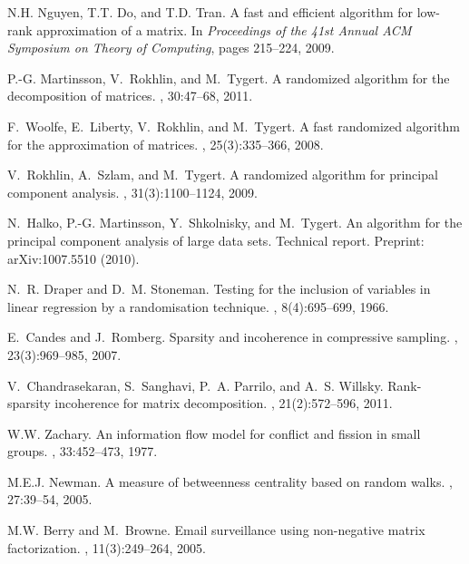 \documentclass[twoside]{article}
\begin{document}
\begin{small}
\begin{thebibliography}{100}
N.H. Nguyen, T.T. Do, and T.D. Tran.
\newblock A fast and efficient algorithm for low-rank approximation of a
  matrix.
\newblock In {\em Proceedings of the 41st Annual ACM Symposium on Theory of
  Computing}, pages 215--224, 2009.

P.-G. Martinsson, V.~Rokhlin, and M.~Tygert.
\newblock A randomized algorithm for the decomposition of matrices.
, 30:47--68, 2011.

F.~Woolfe, E.~Liberty, V.~Rokhlin, and M.~Tygert.
\newblock A fast randomized algorithm for the approximation of matrices.
, 25(3):335--366,
  2008.

V.~Rokhlin, A.~Szlam, and M.~Tygert.
\newblock A randomized algorithm for principal component analysis.
,
  31(3):1100--1124, 2009.

N.~Halko, P.-G. Martinsson, Y.~Shkolnisky, and M.~Tygert.
\newblock An algorithm for the principal component analysis of large data sets.
\newblock Technical report.
\newblock Preprint: arXiv:1007.5510 (2010).

N.~R. Draper and D.~M. Stoneman.
\newblock Testing for the inclusion of variables in linear regression by a
  randomisation technique.
, 8(4):695--699, 1966.

E.~Candes and J.~Romberg.
\newblock Sparsity and incoherence in compressive sampling.
, 23(3):969--985, 2007.

V.~Chandrasekaran, S.~Sanghavi, P.~A. Parrilo, and A.~S. Willsky.
\newblock Rank-sparsity incoherence for matrix decomposition.
, 21(2):572--596, 2011.

W.W. Zachary.
\newblock An information flow model for conflict and fission in small groups.
, 33:452--473, 1977.

M.E.J. Newman.
\newblock A measure of betweenness centrality based on random walks.
, 27:39--54, 2005.

M.W. Berry and M.~Browne.
\newblock Email surveillance using non-negative matrix factorization.
,
  11(3):249--264, 2005.


\end{thebibliography}
\end{small}
\end{document}
